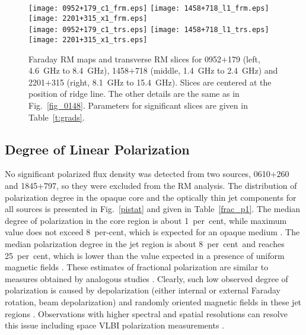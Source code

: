 \documentclass[a4paper,fleqn,usenatbib,useAMS]{mnras}
\begin{document}
\begin{figure*}
\centering
    \texttt{[image: 0952+179\_c1\_frm.eps]}\quad
    \texttt{[image: 1458+718\_l1\_frm.eps]}\quad
    \texttt{[image: 2201+315\_x1\_frm.eps]}\\
    \texttt{[image: 0952+179\_c1\_trs.eps]}\quad
    \texttt{[image: 1458+718\_l1\_trs.eps]}\quad
    \texttt{[image: 2201+315\_x1\_trs.eps]}\\
\caption{Faraday RM maps and transverse RM slices for 0952$+$179 (left, 4.6~GHz to 8.4~GHz), 1458$+$718 (middle, 1.4~GHz to 2.4~GHz) and 2201$+$315 (right, 8.1~GHz to 15.4~GHz). Slices are centered at the position of ridge line. The other details are the same as in Fig.~\ref{fig_0148}.
Parameters for significant slices are given in Table~\ref{t:grads}. \label{fig_trs}}
\end{figure*}


\subsection{Degree of Linear Polarization}
No significant polarized flux density was detected from two sources, 0610+260 and 1845+797, so they were excluded from the RM analysis.
The distribution of polarization degree in the opaque core and the optically thin jet components for all sources is presented in Fig.~\ref{pistat} and given in Table~\ref{frac_p1}.
The median degree of polarization in the core region is about 1~per~cent, while maximum value does not exceed 8~per-cent, which is expected for an opaque medium \citep[e.g.][]{pacholczyk_swihart_67}.
The median polarization degree in the jet region is about 8~per~cent~and reaches 25~per~cent, which is lower than the value expected in a presence of uniform magnetic fields \citep[e.g.][]{gardner_whiteoak_66}.
These estimates of fractional polarization are similar to measures obtained by analogous studies \citep[e.g.][]{lister_homan_05,jorstad_etal07}.
Clearly, such low observed degree of polarization is caused by depolarization (either internal or external Faraday rotation, beam depolarization) and randomly oriented magnetic fields in these jet regions \citep[see, e.g.][]{2011ApJ...737...42P}.
Observations with higher spectral and spatial resolutions can resolve this issue including space VLBI polarization measurements \citep[e.g.][]{lobanov_etal15,2016ApJ...817...96G}.
\end{document}
